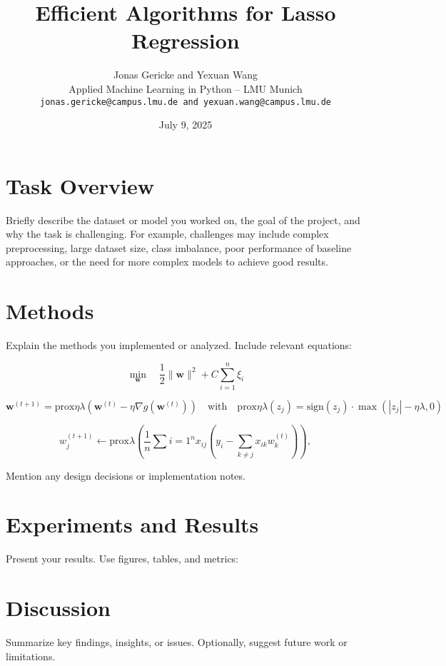 \documentclass[11pt]{article}
\title{\textbf{Efficient Algorithms for Lasso Regression}}
\author{Jonas Gericke and Yexuan Wang \\
Applied Machine Learning in Python -- LMU Munich \\
\texttt{jonas.gericke@campus.lmu.de and yexuan.wang@campus.lmu.de}}
\date{July 9, 2025}
\begin{document}
\maketitle

\section{Task Overview}
Briefly describe the dataset or model you worked on, the goal of the project, and why the task is challenging. For example, challenges may include complex preprocessing, large dataset size, class imbalance, poor performance of baseline approaches, or the need for more complex models to achieve good results.

\section{Methods}
Explain the methods you implemented or analyzed. Include relevant equations:

\[
    \min_{\mathbf{w}} \quad \frac{1}{2} \|\mathbf{w}\|^2 + C \sum_{i=1}^n \xi_i
\]


\[
    \mathbf{w}^{(t+1)} = \text{prox}{\eta \lambda} \left( \mathbf{w}^{(t)} - \eta \nabla g(\mathbf{w}^{(t)}) \right) \quad \text{with} \quad \text{prox}{\eta \lambda}(z_j) = \text{sign}(z_j) \cdot \max(|z_j| - \eta \lambda, 0)
\]

\[
    w_j^{(t+1)} \leftarrow \text{prox}{\lambda}\left( \frac{1}{n} \sum{i=1}^n x_{ij} \left(y_i - \sum_{k \ne j} x_{ik} w_k^{(t)} \right) \right),
\]

Mention any design decisions or implementation notes.

\section{Experiments and Results}
Present your results. Use figures, tables, and metrics:


\section{Discussion}
Summarize key findings, insights, or issues. Optionally, suggest future work or limitations.
\end{document}
